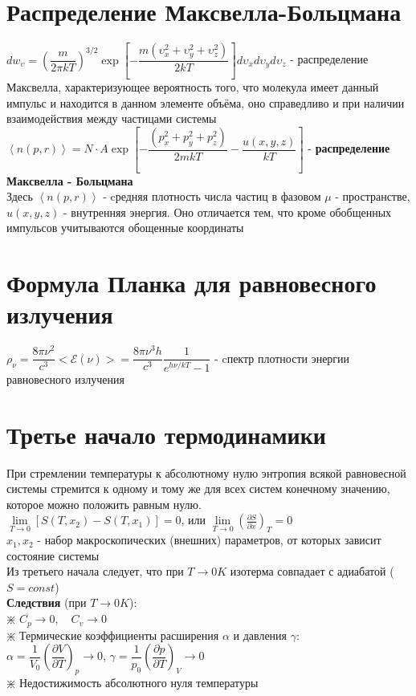 \begin{multicols*}{2}
		\section{Распределение Максвелла-Больцмана}
		$dw_{\upsilon} =\left(\dfrac{m}{2\pi kT}\right)^{3/2}\exp\left[-\dfrac{m(\upsilon^2_x + \upsilon^2_y +\upsilon^2_z)}{2kT}\right]d\upsilon_x d\upsilon_y d\upsilon_z$ - распределение Максвелла, характеризующее вероятность того, что молекула имеет данный импульс и находится в данном элементе объёма, оно справедливо и при наличии взаимодействия между частицами системы \\
		$\left\langle n(p, r)\right\rangle = N\cdot A\exp \left[-\dfrac{(p^2_x + p^2_y + p^2_z)}{2mkT} - \dfrac{u(x,y,z)}{kT}\right]$ - \textbf{распределение Максвелла - Больцмана}\\
		Здесь $\left\langle n(p, r)\right\rangle$ - cредняя плотность числа частиц в фазовом $\mu$ - пространстве, $u(x,y,z)$ - внутренняя энергия. Оно отличается тем, что кроме обобщенных импульсов учитываются обощенные координаты\\

		\section{Формула Планка для равновесного излучения}
		$\rho_\nu=\dfrac{8\pi \nu^2}{c^3}<\mathcal{E}(\nu)>=\dfrac{8\pi \nu^3 h}{c^3}\dfrac{1}{e^{h\nu/kT}-1}$ - cпектр плотности энергии равновесного излучения\\

		\section{Третье начало термодинамики}
		При стремлении температуры к абсолютному  нулю энтропия всякой равновесной системы стремится к одному и тому же для всех систем конечному значению, которое можно положить равным нулю.\\
		$\lim\limits_{T\to 0} [S(T, x_2) - S(T, x_1)] =0$, или $\lim\limits_{T\to 0} \left(\frac{\partial S}{\partial x}\right)_T = 0$\\
		$x_1, x_2$ - набор макроскопических (внешних) параметров, от которых зависит состояние системы\\
		Из третьего начала следует, что при $T\rightarrow 0K$ изотерма совпадает с адиабатой ($S = const$)\\
		\textbf{Следствия} (при $T\rightarrow 0K$):\\
		$\divideontimes$ $C_p \rightarrow 0, \quad C_v \rightarrow 0$\\
		$\divideontimes$ Термические коэффициенты расширения $\alpha$ и давления $\gamma$:\\
		$\alpha = \dfrac{1}{V_0}\left(\dfrac{\partial V}{\partial T}\right)_p \rightarrow 0$, \quad $\gamma = \dfrac{1}{p_0}\left(\dfrac{\partial p}{\partial T}\right)_V \rightarrow 0$\\
		$\divideontimes$ Недостижимость абсолютного нуля температуры\\


\end{multicols*}
